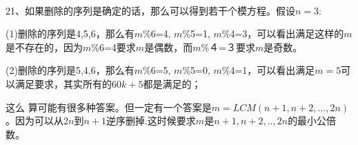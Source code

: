 \documentclass[onecolumn]{article}
\begin{document}
\par ~\\
21、如果删除的序列是确定的话，那么可以得到若干个模方程。假设$n=3$: \par
(1)删除的序列是4,5,6，那么有$m$\%6=4, $m$\%5=1, $m$\%4=3，可以看出满足这样的$m$是不存在的，因为$m$\%6=4要求$m$是偶数，而$m$\%４=３要求$m$是奇数。\par
(2)删除的序列是5,4,6，那么有$m$\%6=5, $m$\%5=0, $m$\%4=1，可以看出满足$m=5$可以满足要求，其实所有的$60k+5$都是满足的； \par
这么
算可能有很多种答案。但一定有一个答案是$m=LCM(n+1,n+2,...,2n)$。因为可以从$2n$到$n+1$逆序删掉.这时候要求$m$是$n+1,n+2,..,2n$的最小公倍数。
\end{document}
